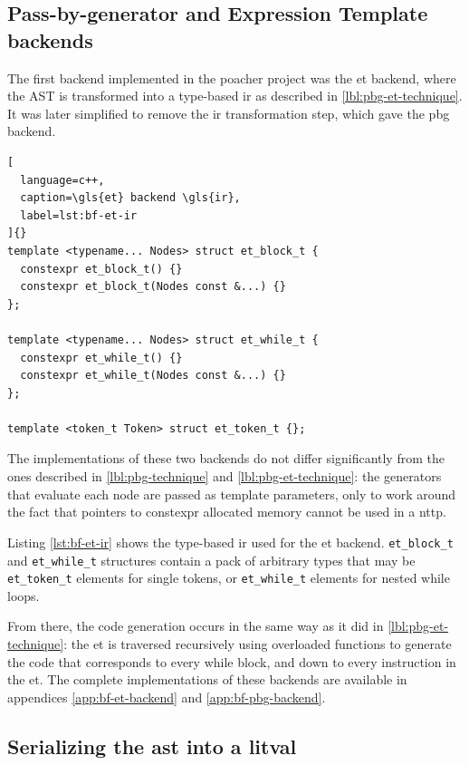 \documentclass[../main]{subfiles}
\begin{document}
\subsection{
  Pass-by-generator and Expression Template backends
}

The first backend implemented in the poacher project was the \gls{et} backend,
where the AST is transformed into a type-based \gls{ir}
as described in \ref{lbl:pbg-et-technique}. It was later simplified to
remove the \gls{ir} transformation step, which gave the \gls{pbg} backend.

\begin{lstlisting}[
  language=c++,
  caption=\gls{et} backend \gls{ir},
  label=lst:bf-et-ir
]{}
template <typename... Nodes> struct et_block_t {
  constexpr et_block_t() {}
  constexpr et_block_t(Nodes const &...) {}
};

template <typename... Nodes> struct et_while_t {
  constexpr et_while_t() {}
  constexpr et_while_t(Nodes const &...) {}
};

template <token_t Token> struct et_token_t {};
\end{lstlisting}

The implementations of these two backends do not differ significantly from
the ones described in \ref{lbl:pbg-technique} and \ref{lbl:pbg-et-technique}:
the generators that evaluate each node are passed as template parameters,
only to work around the fact that pointers to \gls{constexpr} allocated memory
cannot be used in a \gls{nttp}.

Listing \ref{lst:bf-et-ir} shows the type-based \gls{ir} used for the \gls{et}
backend. \lstinline{et_block_t} and \lstinline{et_while_t} structures contain a
pack of arbitrary types that may be \lstinline{et_token_t} elements for single
tokens, or \lstinline{et_while_t} elements for nested while loops.

From there, the code generation occurs in the same way as it did in
\ref{lbl:pbg-et-technique}: the \gls{et} is traversed recursively using
overloaded functions to generate the \cpp code that corresponds to every
while block, and down to every instruction in the \gls{et}.
The complete implementations of these backends are available in appendices
\ref{app:bf-et-backend} and \ref{app:bf-pbg-backend}.

\subsection{
  Serializing the \gls{ast} into a \gls{litval}
}
\end{document}
